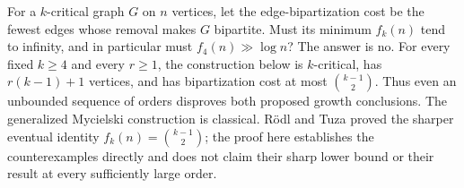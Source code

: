 For a $k$-critical graph $G$ on $n$ vertices, let the edge-bipartization cost be the fewest edges whose removal makes $G$ bipartite. Must its minimum $f_k(n)$ tend to infinity, and in particular must $f_4(n)\gg\log n$?
The answer is no. For every fixed $k\ge4$ and every $r\ge1$, the construction below is $k$-critical, has $r(k-1)+1$ vertices, and has bipartization cost at most $\binom{k-1}{2}$. Thus even an unbounded sequence of orders disproves both proposed growth conclusions.
The generalized Mycielski construction is classical. R\"odl and Tuza proved the sharper eventual identity $f_k(n)=\binom{k-1}{2}$; the proof here establishes the counterexamples directly and does not claim their sharp lower bound or their result at every sufficiently large order.
